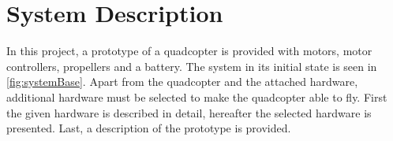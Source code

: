 \chapter{System Description}\label{cha:Systemdescription}
In this project, a prototype of a quadcopter is provided with motors, motor controllers, propellers and a battery. The system in its initial state is seen in \autoref{fig:systemBase}. Apart from the quadcopter and the attached hardware, additional hardware must be selected to make the quadcopter able to fly. First the given hardware is described in detail, hereafter the selected hardware is presented. Last, a description of the prototype is provided.   



%
